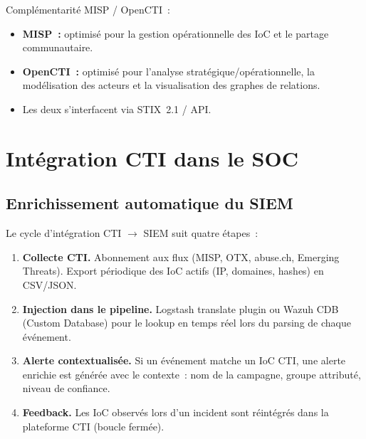 Complémentarité MISP / OpenCTI~:
\begin{itemize}
  \item \textbf{MISP~:} optimisé pour la gestion opérationnelle des IoC
        et le partage communautaire.
  \item \textbf{OpenCTI~:} optimisé pour l'analyse stratégique/opérationnelle,
        la modélisation des acteurs et la visualisation des graphes de
        relations.
  \item Les deux s'interfacent via STIX~2.1 / API.
\end{itemize}

\section{Intégration CTI dans le SOC}
\label{sec:cti-integration}

\subsection{Enrichissement automatique du SIEM}

Le cycle d'intégration CTI $\to$ SIEM suit quatre étapes~:

\begin{enumerate}
  \item \textbf{Collecte CTI.} Abonnement aux flux (MISP, OTX, abuse.ch,
        Emerging Threats). Export périodique des IoC actifs (IP, domaines,
        hashes) en CSV/JSON.
  \item \textbf{Injection dans le pipeline.} Logstash translate plugin
        ou Wazuh CDB (Custom Database) pour le lookup en temps réel lors
        du parsing de chaque événement.
  \item \textbf{Alerte contextualisée.} Si un événement matche un IoC CTI,
        une alerte enrichie est générée avec le contexte~:
        nom de la campagne, groupe attributé, niveau de confiance.
  \item \textbf{Feedback.} Les IoC observés lors d'un incident sont
        réintégrés dans la plateforme CTI (boucle fermée).
\end{enumerate}

